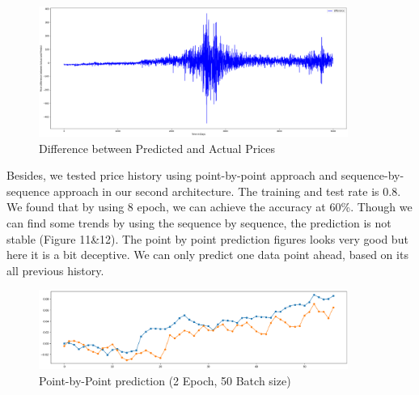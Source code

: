 \begin{figure}[htpb]
\begin{center}
\includegraphics[width=0.9\textwidth]{./figs/pricediff}
\vspace{-0.2cm}
\caption{Difference between Predicted and Actual Prices}
\label{fig_diff}
\end{center}
\vspace{-0.6cm}
\end{figure}



Besides, we tested price history using point-by-point approach and sequence-by-sequence approach in our second architecture. The training and test rate is 0.8. We found that by using 8 epoch, we can achieve the accuracy at 60\%. Though we can find some trends by using the sequence by sequence, the prediction is not stable (Figure 11&12). The point by point prediction figures looks very good but here it is a bit deceptive. We can only predict one data point ahead, based on its all previous history.

\begin{figure}[htpb]
\begin{center}
\includegraphics[width=0.9\textwidth]{./figs/PP_2_50.PNG}
\vspace{-0.2cm}
\caption{Point-by-Point prediction (2 Epoch, 50 Batch size)}
\label{fig_predict}
\end{center}
\vspace{-0.6cm}
\end{figure}


